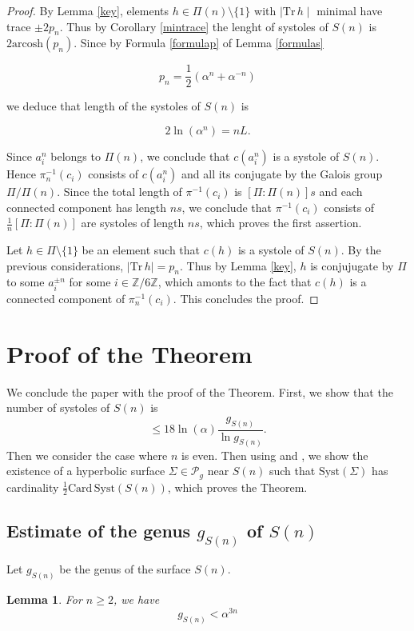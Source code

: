 \documentclass[12pt]{amsart}
\newcommand{\Z}{\mathbb{Z}}
\newcommand{\arcosh}{\mathrm{arcosh}}
\newcommand{\Card}{\mathrm{Card\,}}
\newcommand{\Syst}{{\mathrm {Syst}}}
\newcommand{\Tr}{{\mathrm {Tr}}}
\newtheorem{lemma}{Lemma}
\newcommand{\cP}{\mathcal{P}}
\begin{document}
\begin{proof} By Lemma \ref{key}, elements 
$h\in\Pi(n)\setminus\{1\}$ with $\mid\Tr\,h\mid$ minimal have trace $\pm 2 p_n$. 
Thus by Corollary \ref{mintrace} the lenght of systoles
of $S(n)$ is $2\arcosh(p_n)$. Since by  Formula \ref{formulap}  of Lemma 
\ref{formulas}

$$p_n=\frac{1}{2}(\alpha^n+\alpha^{-n})$$

we deduce that length  of the systoles of $S(n)$ is

$$2\ln(\alpha^n)=nL.$$

Since $a_i^n$ belongs to $\Pi(n)$, we conclude that
$c(a_i^n)$ is a systole of $S(n)$. Hence
$\pi_n^{-1}(c_i)$ consists of $c(a_i^n)$ and all its conjugate by the Galois group $\Pi/\Pi(n)$.
Since the total length of $\pi^{-1}(c_i)$
is $[\Pi:\Pi(n)]s$ and each connected component has length
$ns$, we conclude that
$\pi^{-1}(c_i)$ consists of $\frac{1}{n} [\Pi:\Pi(n)]$ are systoles of length $ns$, which proves the first assertion.

Let $h\in\Pi\setminus\{1\}$ be an element such that
$c(h)$ is a systole of $S(n)$. By the previous considerations, $\mid\Tr\,h\mid=p_n$. Thus 
by Lemma \ref{key}, $h$
is conjujugate by $\Pi$ to some $a_i^{\pm n}$ for
some $i\in\Z/6\Z$, which amonts to the fact that $c(h)$ is a connected component of $\pi_n^{-1}(c_i)$. This concludes
the proof. \end{proof}


\section{Proof of the Theorem}
We conclude the paper with the proof of the Theorem.
First, we show that the number of systoles of $S(n)$ is
$$\leq 18\ln(\alpha)\frac{g_{S(n)}}{\ln g_{S(n)}}.$$
Then we consider the case where $n$ is even. Then using
\cite{Mathieu} and \cite{AII}, we show the existence of a
hyperbolic surface $\Sigma\in\cP_g$ near $S(n)$ such that
$\Syst(\Sigma)$ has cardinality 
$\frac{1}{2}\Card \Syst(S(n))$, which proves the Theorem.


\subsection{Estimate of the genus $g_{S(n)}$ of $S(n)$}

Let $g_{S(n)}$ be the genus of the surface $S(n)$.

\begin{lemma}\label{genus} For $n\geq 2$, we have
$$g_{S(n)}<\alpha^{3n}$$
\end{lemma}
\end{document}
